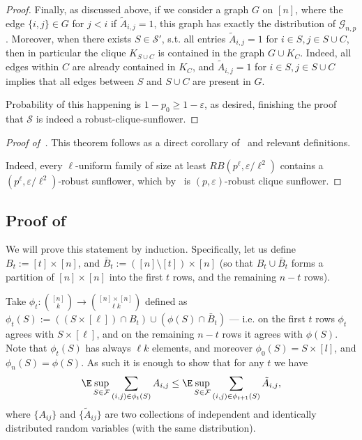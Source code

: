 \begin{proof}
Finally, as discussed above, if we consider a graph $G$ on $[n]$, where the edge $\{i,j\} \in G$ for $j < i$ if $\tilde{A}_{i,j} = 1$, this graph has exactly the distribution of $\mathcal{G}_{n,p}$. Moreover, when there exists $S \in \mathcal{S}'$, s.t. all entries $\tilde{A}_{i,j} = 1$ for $i \in S, j \in S \cup C$, then in particular the clique $K_{S \cup C}$ is contained in the graph $G \cup K_C$. Indeed, all edges within $C$ are already contained in $K_C$, and $\tilde{A}_{i,j} = 1$ for $i \in S, j \in S \cup C$ implies that all edges between $S$ and $S \cup C$ are present in $G$.

Probability of this happening is $1-p_0 \geq 1-\varepsilon$, as desired, finishing the proof that $\mathcal{S}$ is indeed a robust-clique-sunflower.
\end{proof}
\begin{proof}[Proof of~]
    This theorem follows as a direct corollary of~ and relevant definitions.

    Indeed, every $\ell$-uniform family of size at least $RB(p^\ell, \varepsilon/\ell^2)$ contains a $(p^\ell, \varepsilon/\ell^2)$-robust sunflower, which by~ is  $(p, \varepsilon)$-robust clique sunflower.
\end{proof}

\subsection{Proof of~\texorpdfstring{}{Lemma 3.2} \label{sec:proof-of-comparison-lemma}}

We will prove this statement by induction. Specifically, let us define $B_t := [t] \times [n]$, and $\bar{B}_t := ([n] \setminus [t]) \times [n]$ (so that $B_t \cup \bar{B}_t$ forms a partition of $[n]\times[n]$ into the first $t$ rows, and the remaining $n-t$ rows).

Take $\phi_t : \binom{[n]}{k} \to \binom{[n]\times [n]}{\ell k}$ defined as $\phi_t(S) := ((S \times [\ell]) \cap B_t) \cup (\phi(S) \cap \bar{B}_t)$ --- i.e. on the first $t$ rows $\phi_t$ agrees with $S \times [\ell]$, and on the remaining $n-t$ rows it agrees with $\phi(S)$. Note that $\phi_t(S)$ has always $\ell k$ elements, and moreover $\phi_0(S) = S\times [l]$, and $\phi_{n}(S) =\phi(S)$. As such it is enough to show that for any $t$ we have
\begin{equation}
\label{eqn:induction-step}
        \E \sup_{S \in \mathcal{F}} \sum_{(i, j) \in \phi_{t}(S)} A_{i,j} \leq \E \sup_{S \in \mathcal{F}} \sum_{(i,j) \in \phi_{t+1}(S)} \tilde{A}_{i,j},
\end{equation}
where $\{A_{ij}\}$ and $\{\tilde{A}_{ij}\}$ are two collections of independent and identically distributed random variables (with the same distribution).


